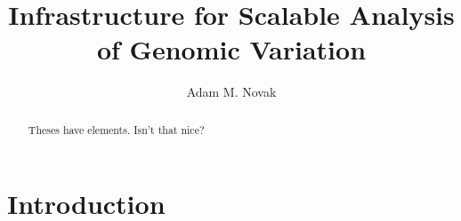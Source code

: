 \documentclass[11pt,proposal]{ucthesis}
\begin{document}

\title{Infrastructure for Scalable Analysis of Genomic Variation}
\author{Adam M. Novak}
\deanlinethree{}

\begin{frontmatter}

\maketitle
\copyrightpage

\tableofcontents
\listoffigures
\listoftables

\begin{abstract}
Theses have elements.  Isn't that nice?

\end{abstract}

\begin{acknowledgements}

\end{acknowledgements}

\end{frontmatter}

\chapter{Introduction}


    
    
    

    
    
\end{document}
